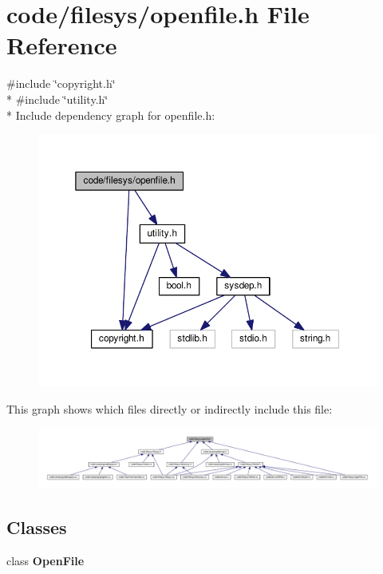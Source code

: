 \section{code/filesys/openfile.h File Reference}
\label{openfile_8h}
{\ttfamily \#include \char`\"{}copyright.\+h\char`\"{}}\\*
{\ttfamily \#include \char`\"{}utility.\+h\char`\"{}}\\*
Include dependency graph for openfile.\+h\+:
\nopagebreak
\begin{figure}[H]
\begin{center}
\leavevmode
\includegraphics[width=350pt]{openfile_8h__incl}
\end{center}
\end{figure}
This graph shows which files directly or indirectly include this file\+:
\nopagebreak
\begin{figure}[H]
\begin{center}
\leavevmode
\includegraphics[width=350pt]{openfile_8h__dep__incl}
\end{center}
\end{figure}
\subsection*{Classes}
\begin{DoxyCompactItemize}
\item 
class {\bf Open\+File}
\end{DoxyCompactItemize}
